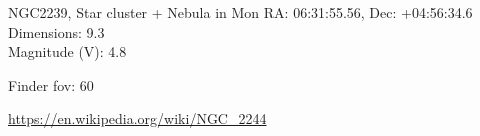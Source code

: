 \begin{block}{NGC2239, Star cluster + Nebula in Mon}
    RA: 06:31:55.56, Dec: +04:56:34.6 \\ 
    Dimensions: 9.3 \\ 
    Magnitude (V): 4.8



    Finder fov: 60 

    \url{https://en.wikipedia.org/wiki/NGC_2244} 
\end{block}